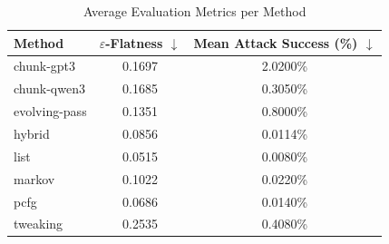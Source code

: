 \begin{table}[h]
\centering
\caption{Average Evaluation Metrics per Method}
\label{tab:honeyword-metrics}
\begin{tabular}{lcc}
\hline
Method & $\varepsilon$-Flatness $\downarrow$ & Mean Attack Success (\%) $\downarrow$ \\
\hline
  chunk-gpt3 & 0.1697 & 2.0200\% \\
  chunk-qwen3 & 0.1685 & 0.3050\% \\
  evolving-pass & 0.1351 & 0.8000\% \\
  hybrid & 0.0856 & 0.0114\% \\
  list & 0.0515 & 0.0080\% \\
  markov & 0.1022 & 0.0220\% \\
  pcfg & 0.0686 & 0.0140\% \\
  tweaking & 0.2535 & 0.4080\% \\
\hline
\end{tabular}
\end{table}